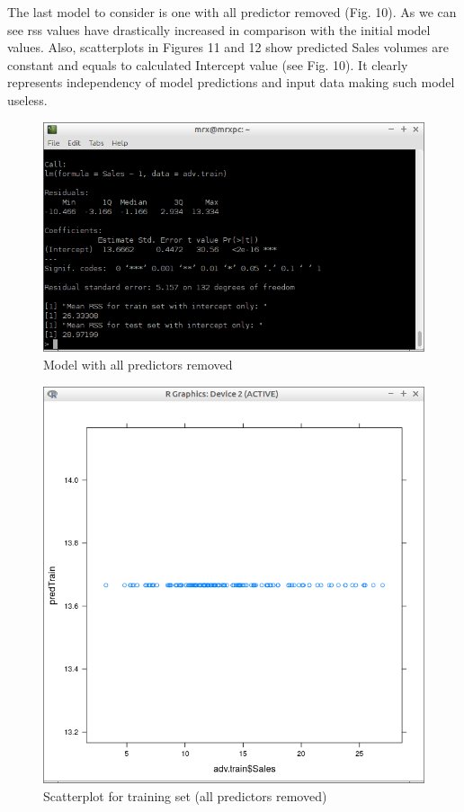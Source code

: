 \documentclass[10pt,a4paper]{article}
\begin{document}
The last model to consider is one with all predictor removed (Fig. 10). As we can see rss values have drastically increased in comparison with the initial model values. Also, scatterplots in Figures 11 and 12 show predicted Sales volumes are constant and equals to calculated Intercept value (see Fig. 10). It clearly represents independency of model predictions and input data making such model useless.

\begin{figure}[H]
\centering
\includegraphics[width=140mm]{figures/int.png}
\caption{Model with all predictors removed \label{overflow}}
\end{figure}

\begin{figure}[H]
\centering
\includegraphics[width=140mm]{figures/pltIntTrain.png}
\caption{Scatterplot for training set (all predictors removed) \label{overflow}}
\end{figure}
\end{document}
